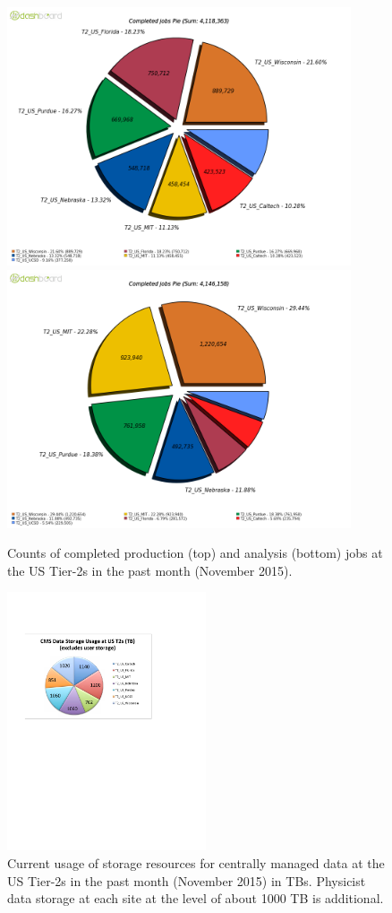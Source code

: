 \documentclass[11pt,a4paper]{article}
\begin{document}
\begin{figure}
\label{computingJobsAtUST2sInOneMonth}
\begin{center}
\includegraphics[height=3in]{productionJobsAtUST2sInOneMonth.png}
\includegraphics[height=3in]{analysisJobsAtUST2sInOneMonth.png}
\end{center}
\caption{Counts of completed production (top) and analysis (bottom) 
jobs at the US Tier-2s in the past month (November 2015).}
\end{figure}

\begin{figure}
\label{storageUtilizationAtUST2s-Chart}
\begin{center}
\includegraphics[height=3in]{storageUtilizationAtUST2s-Chart.pdf}
\end{center}
\caption{Current usage of storage resources for centrally managed
data at the US Tier-2s in the past month (November 2015) in TBs. 
Physicist data storage at each site at the level of about 1000 TB
is additional.}
\end{figure}
\end{document}
